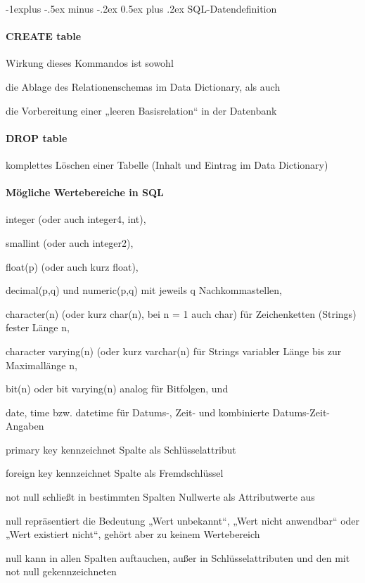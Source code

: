 \documentclass[a4paper]{article}
\makeatletter
\renewcommand{\subsection}{\@startsection{subsection}{2}{0mm}%
                                {-1explus -.5ex minus -.2ex}%
                                {0.5ex plus .2ex}%
                                {\normalfont\normalsize\bfseries}}
\makeatother
\begin{document}
\begin{multicols}{3}
\subsection{SQL-Datendefinition}
\paragraph{CREATE table}
Wirkung dieses Kommandos ist sowohl
\begin{itemize*}
    \item die Ablage des Relationenschemas im Data Dictionary, als auch
    \item die Vorbereitung einer „leeren Basisrelation“ in der Datenbank
\end{itemize*}

\paragraph{DROP table}
komplettes Löschen einer Tabelle (Inhalt und Eintrag im Data
Dictionary)

\paragraph{Mögliche Wertebereiche in SQL}
\begin{itemize*}
    \item integer (oder auch integer4, int),
    \item smallint (oder auch integer2),
    \item float(p) (oder auch kurz float),
    \item decimal(p,q) und numeric(p,q) mit jeweils q Nachkommastellen,
    \item character(n) (oder kurz char(n), bei n = 1 auch char) für Zeichenketten (Strings) fester Länge n,
    \item character varying(n) (oder kurz varchar(n) für Strings variabler Länge bis zur Maximallänge n,
    \item bit(n) oder bit varying(n) analog für Bitfolgen, und
    \item date, time bzw. datetime für Datums-, Zeit- und kombinierte Datums-Zeit-Angaben
\end{itemize*}

\begin{itemize*}
    \item primary key kennzeichnet Spalte als Schlüsselattribut
    \item foreign key kennzeichnet Spalte als Fremdschlüssel
    \item not null schließt in bestimmten Spalten Nullwerte als Attributwerte aus
    \item null repräsentiert die Bedeutung „Wert unbekannt“, „Wert nicht anwendbar“ oder „Wert existiert nicht“, gehört aber zu keinem Wertebereich
    \item null kann in allen Spalten auftauchen, außer in Schlüsselattributen und den mit not null gekennzeichneten
\end{itemize*}



\end{multicols}
\end{document}
